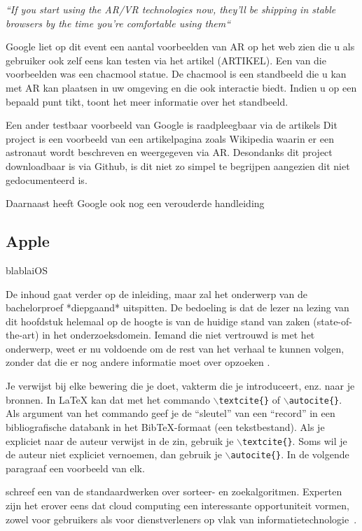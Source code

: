 \textit{``If you start using the AR/VR technologies now, they’ll be shipping in stable browsers by the time you’re comfortable using them``}

Google liet op dit event een aantal voorbeelden van AR op het web zien die u als gebruiker ook zelf eens kan testen via het artikel (ARTIKEL). Een van die voorbeelden was een chacmool statue. De chacmool is een standbeeld die u kan met AR kan plaatsen in uw omgeving en die ook interactie biedt. Indien u op een bepaald punt tikt, toont het meer informatie over het standbeeld. 

Een ander testbaar voorbeeld van Google is raadpleegbaar via de artikels %
Dit project is een voorbeeld van een artikelpagina zoals Wikipedia waarin er een astronaut wordt beschreven en weergegeven via AR. Desondanks dit project downloadbaar is via Github, is dit niet zo simpel te begrijpen aangezien dit niet gedocumenteerd is. 
 
 Daarnaast heeft Google ook nog een verouderde handleiding 


\subsection{Apple}

blablaiOS


De inhoud gaat verder op de inleiding, maar zal het onderwerp van de bachelorproef *diepgaand* uitspitten. De bedoeling is dat de lezer na lezing van dit hoofdstuk helemaal op de hoogte is van de huidige stand van zaken (state-of-the-art) in het onderzoeksdomein. Iemand die niet vertrouwd is met het onderwerp, weet er nu voldoende om de rest van het verhaal te kunnen volgen, zonder dat die er nog andere informatie moet over opzoeken \autocite{Pollefliet2011}.

Je verwijst bij elke bewering die je doet, vakterm die je introduceert, enz. naar je bronnen. In \LaTeX{} kan dat met het commando \texttt{$\backslash${textcite\{\}}} of \texttt{$\backslash${autocite\{\}}}. Als argument van het commando geef je de ``sleutel'' van een ``record'' in een bibliografische databank in het Bib\TeX{}-formaat (een tekstbestand). Als je expliciet naar de auteur verwijst in de zin, gebruik je \texttt{$\backslash${}textcite\{\}}.
Soms wil je de auteur niet expliciet vernoemen, dan gebruik je \texttt{$\backslash${}autocite\{\}}. In de volgende paragraaf een voorbeeld van elk.

\textcite{Knuth1998} schreef een van de standaardwerken over sorteer- en zoekalgoritmen. Experten zijn het erover eens dat cloud computing een interessante opportuniteit vormen, zowel voor gebruikers als voor dienstverleners op vlak van informatietechnologie~\autocite{Creeger2009}.

\lipsum[7-20]
